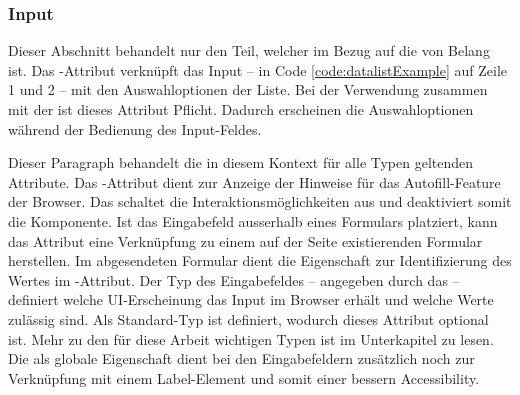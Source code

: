 \subsubsection{\color{dgray} Input}
\label{sec:input}

Dieser Abschnitt behandelt nur den Teil, welcher im Bezug auf die  von Belang ist. 
Das -Attribut verknüpft das Input – in Code \ref{code:datalistExample} auf Zeile 1 und 2 – mit den Auswahloptionen der Liste. 
Bei der Verwendung zusammen mit der  ist dieses Attribut Pflicht. 
Dadurch erscheinen die Auswahloptionen während der Bedienung des Input-Feldes. 

Dieser Paragraph behandelt die in diesem Kontext für alle Typen geltenden Attribute. 
Das -Attribut dient zur Anzeige der Hinweise für das Autofill-Feature der Browser. 
Das  schaltet die Interaktionsmöglichkeiten aus und deaktiviert somit die Komponente. 
Ist das Eingabefeld ausserhalb eines Formulars platziert, kann das Attribut  eine Verknüpfung zu einem auf der Seite existierenden Formular herstellen. 
Im abgesendeten Formular dient die Eigenschaft  zur Identifizierung des Wertes im -Attribut. 
Der Typ des Eingabefeldes – angegeben durch das  – definiert welche UI-Erscheinung das Input im Browser erhält und welche Werte zulässig sind. 
Als Standard-Typ ist  definiert, wodurch dieses Attribut optional ist. 
Mehr zu den für diese Arbeit wichtigen Typen ist im Unterkapitel \textbf{} zu lesen. 
Die  als globale Eigenschaft dient bei den Eingabefeldern zusätzlich noch zur Verknüpfung mit einem Label-Element und somit einer bessern Accessibility. 


